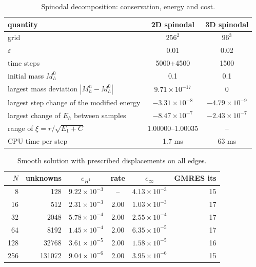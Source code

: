 \documentclass[11pt]{article}
\begin{document}
\clearpage
\begin{table}[htbp]\centering\small
\caption{Spinodal decomposition: conservation, energy and cost.}
\begin{tabular}{>{\raggedright\arraybackslash}p{} cc}
\toprule
quantity & 2D spinodal & 3D spinodal\\
\midrule
grid & $256^2$ & $96^3$\\
$\varepsilon$ & 0.01 & 0.02\\
time steps & 5000+4500 & 1500\\
initial mass $M_h^0$ & 0.1 & 0.1\\
largest mass deviation $|M_h^n-M_h^0|$ & $9.71{\times}10^{-17}$ & 0\\
largest step change of the modified energy & $-3.31{\times}10^{-8}$ & $-4.79{\times}10^{-9}$\\
largest change of $E_h$ between samples & $-8.47{\times}10^{-7}$ & $-2.43{\times}10^{-7}$\\
range of $\xi=r/\sqrt{E_1+C}$ & 1.00000--1.00035 & --\\
CPU time per step & 1.7 ms & 63 ms\\
\bottomrule
\end{tabular}
\end{table}

\begin{table}[htbp]\centering\small
\caption{Smooth solution with prescribed displacements on all edges.}
\begin{tabular}{rr cc cr}
\toprule
$N$ & unknowns & $e_{H^1}$ & rate & $e_\infty$ & GMRES its\\
\midrule
8 & 128 & $9.22{\times}10^{-3}$ & -- & $4.13{\times}10^{-3}$ & 15\\
16 & 512 & $2.31{\times}10^{-3}$ & 2.00 & $1.03{\times}10^{-3}$ & 17\\
32 & 2048 & $5.78{\times}10^{-4}$ & 2.00 & $2.55{\times}10^{-4}$ & 17\\
64 & 8192 & $1.45{\times}10^{-4}$ & 2.00 & $6.35{\times}10^{-5}$ & 17\\
128 & 32768 & $3.61{\times}10^{-5}$ & 2.00 & $1.58{\times}10^{-5}$ & 16\\
256 & 131072 & $9.04{\times}10^{-6}$ & 2.00 & $3.95{\times}10^{-6}$ & 15\\
\bottomrule
\end{tabular}
\end{table}
\end{document}
